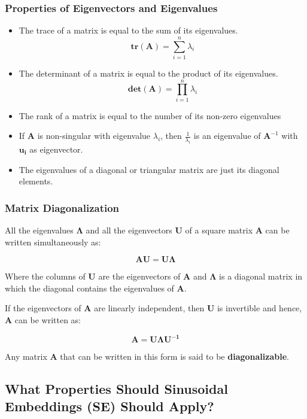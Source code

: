 \documentclass{article}
\begin{document}
	
\subsubsection{Properties of Eigenvectors and Eigenvalues}
\begin{itemize}
	\item The trace of a matrix is equal to the sum of its eigenvalues.
	$$
		\mathbf{tr(A)} = \sum_{i = 1}^{n}{\lambda_i}
	$$
	\item The determinant of a matrix is equal to the product of its eigenvalues.
	$$
	\mathbf{det(A)} = \prod_{i = 1}^{n}{\lambda_i}
	$$
	\item The rank of a matrix is equal to the number of its non-zero eigenvalues
	\item If $\mathbf{A}$ is non-singular with eigenvalue $\lambda_i$, then $\frac{1}{\lambda_i}$ is an eigenvalue of $\mathbf{A}^{-1}$ with $\mathbf{u_i}$ as eigenvector.
	\item The eigenvalues of a diagonal or triangular matrix are just its diagonal elements.
\end{itemize}

\subsubsection{Matrix Diagonalization}

All the eigenvalues $\mathbf{\Lambda}$ and all the eigenvectors $\mathbf{U}$ of a square matrix $\mathbf{A}$ can be written simultaneously as:

$$
	\mathbf{AU} = \mathbf{U\Lambda}
$$

Where the columns of $\mathbf{U}$ are the eigenvectors of $\mathbf{A}$ and $\mathbf{\Lambda}$ is a diagonal matrix in which the diagonal contains the eigenvalues of $\mathbf{A}$.

If the eigenvectors of $\mathbf{A}$ are linearly independent, then $\mathbf{U}$ is invertible and hence, $\mathbf{A}$ can be written as:

$$
	\mathbf{A}=  \mathbf{U\Lambda U^{-1}}
$$

Any matrix $\mathbf{A}$  that can be written in this form is said to be \textbf{diagonalizable}.

\subsection{What Properties Should Sinusoidal Embeddings (SE) Should Apply?}
\end{document}
